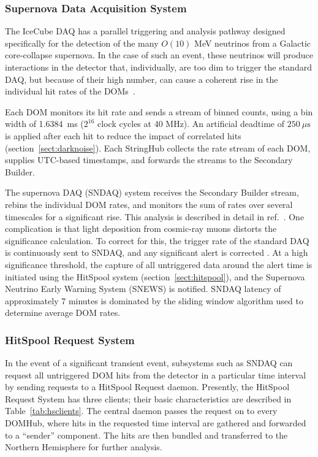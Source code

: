 \subsubsection{\label{sect:SNDAQ}Supernova Data Acquisition System}

The IceCube DAQ has a parallel triggering and analysis pathway designed
specifically for the detection of the many $O(10)$ MeV neutrinos from a
Galactic core-collapse supernova.  In the case of such an event, these
neutrinos will produce interactions in
the detector that, individually, are too dim to trigger the standard DAQ,
but because of their high number, can cause a coherent rise in the
individual hit rates of the DOMs~\cite{IC3:supernova}.

Each DOM monitors its hit rate and sends a stream of binned counts, using a
bin width of 1.6384~ms ($2^{16}$ clock cycles at 40 MHz).  An artificial
deadtime of $250\ {\mu}\mathrm{s}$ is applied after each hit to reduce the
impact of correlated hits (section~\ref{sect:darknoise}).  Each
StringHub collects the rate stream of each DOM, supplies UTC-based timestamps,
and forwards the streams to the Secondary Builder.

The supernova DAQ (SNDAQ) system receives the Secondary Builder stream,
rebins the individual DOM rates, and monitors the sum of rates over several
timescales for a significant rise.  This analysis is described in
detail in ref.~\cite{IC3:supernova}.  One complication is that light
deposition from cosmic-ray muons distorts the significance
calculation.  To correct for this, the trigger rate of the standard DAQ is
continuously sent to SNDAQ, and any significant alert is corrected
\cite{IC3:icrc15_sndaq}.  At a high significance threshold, the capture of
all untriggered data around the alert time is initiated using the HitSpool
system (section~\ref{sect:hitspool}), and the Supernova Neutrino Early Warning
System (SNEWS) \cite{SNEWS} is notified.  SNDAQ latency of approximately 7
minutes is dominated by the sliding window algorithm used to determine
average DOM rates. 

\subsubsection{\label{sect:hitspool}HitSpool Request System}

In the event of a significant transient event, subsystems such as SNDAQ can
request all untriggered DOM hits from the detector in 
a particular time interval by sending requests to a HitSpool Request daemon. Presently,
the HitSpool Request System has three clients; 
their basic characteristics are described in
Table~\ref{tab:hsclients}.  The central daemon passes the request on to 
every DOMHub, where hits in the requested time
interval are gathered and forwarded to a ``sender'' component.  The hits
are then bundled and transferred to the Northern Hemisphere for further analysis.

